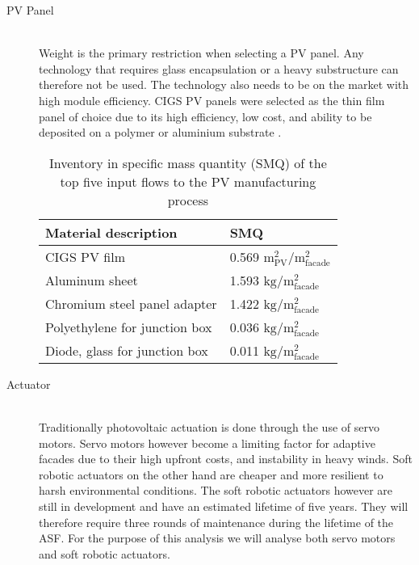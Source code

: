 \begin{description}

\item[PV Panel] \hfill\\
Weight is the primary restriction when selecting a PV panel. Any technology that requires glass encapsulation or a heavy substructure can therefore not be used. The technology also needs to be on the market with high module efficiency. CIGS PV panels were selected as the thin film panel of choice due to its high efficiency, low cost, and ability to be deposited on a polymer or aluminium substrate \cite{chirilua2011highly}. 




\begin{table}[H]
\centering
\begin{tabular}{ll}
\hline
Material description & SMQ \\ \hline
CIGS PV film       	 & 0.569 ${\mathrm{m^2_{PV}/m^2_{facade}}}$\\
Aluminum sheet 	 & 1.593 ${\mathrm{kg/m^2_{facade}}}$\\
Chromium steel panel adapter  & 1.422 ${\mathrm{kg/m^2_{facade}}}$\\
Polyethylene for junction box & 0.036 ${\mathrm{kg/m^2_{facade}}}$\\
Diode, glass for junction box & 0.011 ${\mathrm{kg/m^2_{facade}}}$\\
\hline
\end{tabular}
\caption{Inventory in specific mass quantity (SMQ) of the top five input flows to the PV manufacturing process}
\label{tab:PVinv}
\end{table}

\item[Actuator] \hfill \\
Traditionally photovoltaic actuation is done through the use of servo motors. Servo motors however become a limiting factor for adaptive facades due to their high upfront costs, and instability in heavy winds. Soft robotic actuators on the other hand are cheaper and more resilient to harsh environmental conditions\cite{Svetozarevic2014a}. The soft robotic actuators however are still in development and have an estimated lifetime of five years. They will therefore require three rounds of maintenance during the lifetime of the ASF.
For the purpose of this analysis we will analyse both servo motors and soft robotic actuators. 


\end{description}
